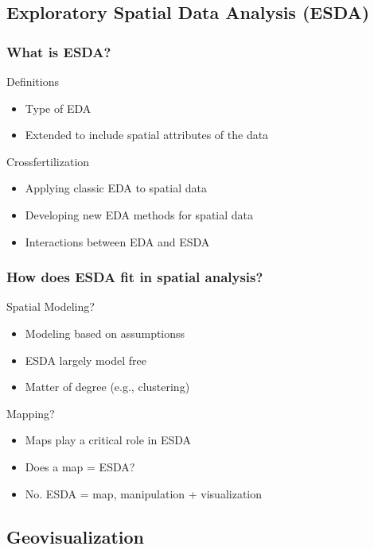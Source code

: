 \documentclass[nototal]{beamer}
\begin{document}
\subsection{Exploratory Spatial Data Analysis (ESDA)} 

\begin{frame}
	\frametitle{What is ESDA?}
 
\begin{block}{Definitions}
 \begin{itemize}
 \item  Type of EDA
 \item  Extended to include spatial attributes of the data
 \end{itemize}
 \end{block} 
\begin{block}{Crossfertilization}
 \begin{itemize}
 \item  Applying classic EDA to spatial data
 \item  Developing new EDA methods for spatial data
 \item  Interactions between EDA and ESDA
 \end{itemize}
 \end{block} \end{frame} 

\begin{frame}
	\frametitle{How does ESDA fit in spatial analysis?}
 
\begin{block}{Spatial Modeling?}
 \begin{itemize}
 \item  Modeling based on assumptionss
 \item  ESDA largely model free
 \item  Matter of degree (e.g., clustering)
 \end{itemize}
 \end{block} 
\begin{block}{Mapping?}
 \begin{itemize}
 \item  Maps play a critical role in ESDA
 \item  Does a map = ESDA?
 \item  No. ESDA = map, manipulation + visualization
 \end{itemize}
 \end{block} \end{frame} 

\subsection{Geovisualization} 
\end{document}
